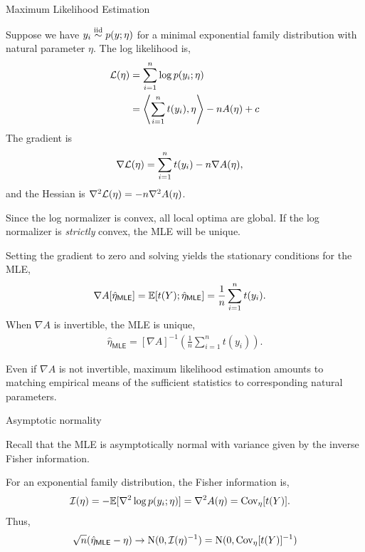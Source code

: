 \documentclass[aspectratio=169]{beamer}
\begin{document}
\begin{frame}[t,allowframebreaks]{Maximum Likelihood
Estimation}\label{maximum-likelihood-estimation}

Suppose we have \(y_i \stackrel{\text{iid}}{\sim} p(y; \eta)\) for a minimal exponential
family distribution with natural parameter \(\eta\). The log likelihood
is, \begin{align*}
\mathcal{L}(\eta)
&= \sum_{i=1}^n \log p(y_i; \eta) \\
&= \left \langle \sum_{i=1}^n t(y_i), \eta \right \rangle - n A(\eta) + c
\end{align*} The gradient is \begin{align*}
\nabla \mathcal{L}(\eta)
&= \sum_{i=1}^n t(y_i) - n \nabla A(\eta),
\end{align*} and the Hessian is
\(\nabla^2 \mathcal{L}(\eta) = -n \nabla^2 A(\eta)\).

Since the log normalizer is convex, all local optima are global. If the
log normalizer is \emph{strictly} convex, the MLE will be unique.

Setting the gradient to zero and solving yields the stationary
conditions for the MLE, \begin{align*}
\nabla A[\hat{\eta}_{\mathsf{MLE}}] &= \mathbb{E}[t(Y); \hat{\eta}_{\mathsf{MLE}}] 
= \frac{1}{n} \sum_{i=1}^n t(y_i).
\end{align*} When \(\nabla A\) is invertible, the MLE is unique,
\begin{align*}
\hat{\eta}_{\mathsf{MLE}} = [\nabla A]^{-1} \left( \frac{1}{n} \sum_{i=1}^n t(y_i) \right).
\end{align*} 

Even if \(\nabla A\) is not invertible, maximum likelihood
estimation amounts to matching empirical means of the sufficient
statistics to corresponding natural parameters.
\end{frame}

\begin{frame}[t,allowframebreaks]{Asymptotic normality}\label{asymptotic-normality}

Recall that the MLE is asymptotically normal with variance given by the
inverse Fisher information.

For an exponential family distribution, the Fisher information is,
\begin{align*}
\mathcal{I}(\eta) &= - \mathbb{E}[\nabla^2 \log p(y_i; \eta)] = \nabla^2 A(\eta) = \textrm{Cov}_\eta[t(Y)].
\end{align*} 
Thus, 
\begin{align*}
    \sqrt{n} (\hat{\eta}_{\mathsf{MLE}} - \eta) \to \mathrm{N}(0, \mathcal{I}(\eta)^{-1}) 
    = \mathrm{N}(0, \textrm{Cov}_\eta[t(Y)]^{-1})
\end{align*}
\end{frame}
\end{document}

